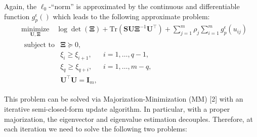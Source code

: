 \documentclass[]{article}
\begin{document}
Again, the \(\ell_0\)-``norm'' is approximated by the continuous and
differentiable function \(g_p^{\epsilon}()\) which leads to the
following approximate problem: \[\begin{aligned}
    &\underset{\mathbf{U},\mathbf{\Xi}}{\text{minimize}}\quad\log\det\left(\mathbf{\Xi}\right)+\text{Tr}\left(\mathbf{S}\mathbf{U}\mathbf{\Xi}^{-1}\mathbf{U}^\top\right) +\sum_{j=1}^{m}\rho_j \sum_{i=1}^{m}g_p^{\epsilon}\left(u_{ij}\right)\\
        &\!\begin{array}{lll}
        \text{subject to} & \mathbf{\Xi}\succcurlyeq0, &\\
         & \xi_{i}\geq \xi_{i+1}, & i=1,\dots, q-1,\\
         & \xi_{q}\geq \xi_{q+i}, & i=1,\dots,m-q,\\
         & \mathbf{U}^\top\mathbf{U}=\mathbf{I}_m,
        \end{array}
    \end{aligned}\]

This problem can be solved via Majorization-Minimization (MM) {[}2{]}
with an iterative semi-closed-form update algorithm. In particular, with
a proper majorization, the eigenvector and eigenvalue estimation
decouples. Therefore, at each iteration we need to solve the following
two problems:
\end{document}
